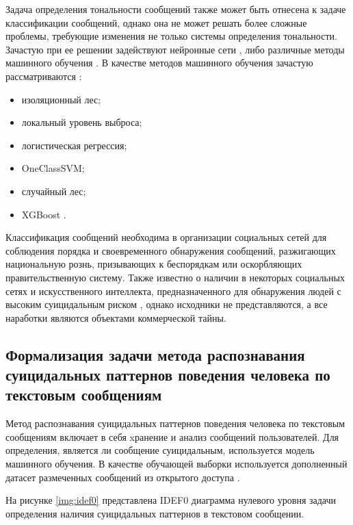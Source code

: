 Задача определения тональности сообщений также может быть отнесена к задаче классификации сообщений, однако она не может решать более сложные проблемы, требующие изменения не только системы определения тональности. 
Зачастую при ее решении задействуют нейронные сети \cite{classificationPromlems}, либо различные методы машинного обучения \cite{presuicidalSignals}.
В качестве методов машинного обучения зачастую рассматриваются \cite{presuicidalSignals}:

\begin{itemize}
	\item изоляционный лес;
	\item локальный уровень выброса;
	\item логистическая регрессия;
	\item OneClassSVM;
	\item случайный лес;
	\item XGBoost \cite{boosting}.
\end{itemize}

Классификация сообщений необходима в организации социальных сетей для соблюдения порядка и своевременного обнаружения сообщений, разжигающих национальную рознь, призывающих к беспорядкам или оскорбляющих правительственную систему.
Также известно о наличии в некоторых социальных сетях и искусственного интеллекта, предназначенного для обнаружения людей с высоким суицидальным риском \cite{faceSuicide}, однако исходники не представляются, а все наработки являются объектами коммерческой тайны.


\subsection{Формализация задачи метода распознавания суицидальных паттернов поведения человека по текстовым сообщениям}

Метод распознавания суицидальных паттернов поведения человека по текстовым сообщениям включает в себя xранение и анализ сообщений пользователей. Для определения, является ли сообщение суицидальным, используется модель машинного обучения. В качестве обучающей выборки используется дополненный датасет размеченных сообщений из открытого доступа \cite{dataset}.

На рисунке \ref{img:idef0} представлена IDEF0 диаграмма нулевого уровня задачи определения наличия суицидальных паттернов в текстовом сообщении.

